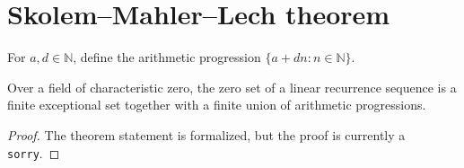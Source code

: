 \section{Skolem--Mahler--Lech theorem}

\begin{definition}
\label{def:sml-arith-prog}
\leanok
For $a,d\in\mathbb N$, define the arithmetic progression $\{a+dn:n\in\mathbb N\}$.
\end{definition}

\begin{theorem}
\label{thm:skolem-mahler-lech}
\notready
{}
Over a field of characteristic zero, the zero set of a linear recurrence sequence is a finite exceptional set together with a finite union of arithmetic progressions.
\end{theorem}

\begin{proof}
The theorem statement is formalized, but the proof is currently a \texttt{sorry}.
\end{proof}
